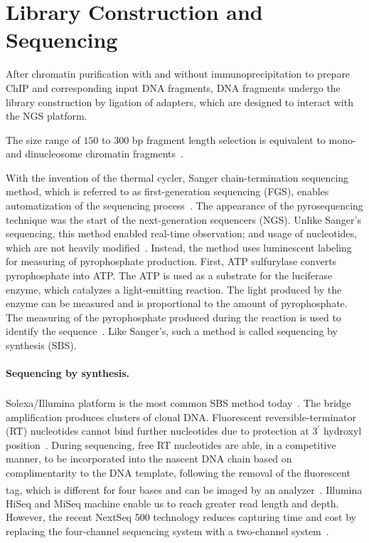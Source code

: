 \section{Library Construction and Sequencing}

After chromatin purification with and without immunoprecipitation to prepare ChIP and corresponding input DNA fragments, DNA fragments undergo the library construction by ligation of adapters, which are designed to interact with the NGS platform.


The size range of $150$ to $300$ bp fragment length selection is equivalent to mono- and dinucleosome chromatin fragments~\cite{kidder2011chip}.

With the invention of the thermal cycler,  Sanger chain-termination sequencing method, which is referred to as first-generation sequencing (FGS), enables automatization of the sequencing process~\cite{quail2012tale}. 
The appearance of the pyrosequencing technique was the start of the next-generation sequencers (NGS). 
Unlike Sanger's sequencing, this method enabled real-time observation; and usage of nucleotides, which are not heavily modified~\cite{ronaghi1996real, ronaghi1998sequencing}.
Instead, the method uses luminescent labeling for measuring of pyrophosphate production. 
First, ATP sulfurylase converts pyrophosphate into ATP. 
The ATP is used as a substrate for the luciferase enzyme, which catalyzes a light-emitting reaction. 
The light produced by the enzyme can be measured and is proportional to the amount of pyrophosphate. 
The measuring of the pyrophosphate produced during the reaction is used to identify the sequence~\cite{hyman1988new}. 
Like Sanger's, such a method is called sequencing by synthesis (SBS).

\paragraph{Sequencing by synthesis.}
Solexa/Illumina\textsuperscript{\texttrademark} platform is the most common SBS method today~\cite{voelkerding2009next}. 
The bridge amplification produces clusters of clonal DNA. 
Fluorescent reversible-terminator (RT) nucleotides cannot bind further nucleotides due to protection at $3^\prime$ hydroxyl position~\cite{heather2016sequence}. 
During sequencing, free RT nucleotides are able, in a competitive manner, to  be incorporated into the nascent DNA chain based on complimentarity to the DNA template, following the removal of the fluorescent tag, which is different for four bases and can be imaged by an analyzer~\cite{berglund2011next}. 
Illumina\textsuperscript{\texttrademark} HiSeq and MiSeq machine enable us to reach greater read length and depth. 
However, the recent NextSeq 500 technology reduces capturing time and cost by replacing the four-channel sequencing system with a two-channel system~\cite{reuter2015high}. 



